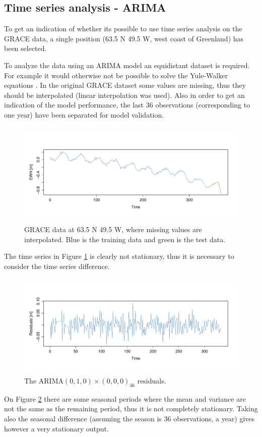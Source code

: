 
\subsection{Time series analysis - ARIMA}

To get an indication of whether its possible to use time series analysis on the GRACE data, a single position (63.5 N 49.5 W, west coast of Greenland) has been selected.

To analyze the data using an ARIMA model an equidistant dataset is required. For example it would otherwise not be possible to solve the Yule-Walker equations \cite[s.~122]{time-series-analysis}. In the original GRACE dataset some values are missing, thus they should be interpolated (linear interpolation was used). Also in order to get an indication of the model performance, the last 36 observations (corresponding to one year) have been separated for model validation.

\begin{figure}[H]
\centering
\includegraphics[height=5cm]{figures/ts-initial-split}
\caption{GRACE data at 63.5 N 49.5 W, where missing values are interpolated. Blue is the training data and green is the  test data.}
\label{fig:ts-initial-split}
\end{figure}

The time series in Figure \ref{fig:ts-initial-split} is clearly not stationary, thus it is necessary to consider the time series difference.
\begin{figure}[H]
\centering
\includegraphics[height=5cm]{figures/ts-residual-i1s0}
\caption{The ARIMA$(0,1,0) \times (0,0,0)_{36}$ residuals.}
\label{fig:ts-residual-i1s0}
\end{figure}
On Figure \ref{fig:ts-residual-i1s0} there are some seasonal periods where the mean and variance are not the same as the remaining period, thus it is not completely stationary. Taking also the seasonal difference (assuming the season is 36 observations, a year) gives however a very stationary output.

